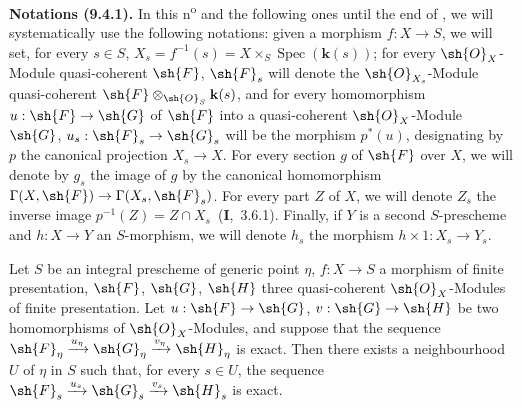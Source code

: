 \begin{env}[9.4.1]
\label{IV.9.4.1}
\textbf{Notations (9.4.1).}
In this n\textsuperscript{o} and the following ones until the end of , we will systematically use the following notations: given a morphism $f:X\to S$, we will set, for every $s\in S$, $X_s=f^{-1}(s)=X\times_S\operatorname{Spec}(\mathbf{k}(s))$; for every $\sh{O}_X$-Module quasi-coherent $\sh{F}$, $\sh{F}_s$ will denote the $\sh{O}_{X_s}$-Module quasi-coherent $\sh{F}\otimes_{\sh{O}_S}\mathbf{k}(s)$, and for every homomorphism $u:\sh{F}\to\sh{G}$ of $\sh{F}$ into a quasi-coherent $\sh{O}_X$-Module $\sh{G}$, $u_s:\sh{F}_s\to\sh{G}_s$ will be the morphism $p^*(u)$, designating by $p$ the canonical projection $X_s\to X$.
For every section $g$ of $\sh{F}$ over $X$, we will denote by $g_s$ the image of $g$ by the canonical homomorphism $\Gamma(X,\sh{F})\to\Gamma(X_s,\sh{F}_s)$.
For every part $Z$ of $X$, we will denote $Z_s$ the inverse image $p^{-1}(Z)=Z\cap X_s$~(\textbf{I},~3.6.1).
Finally, if $Y$ is a second $S$-prescheme and $h:X\to Y$ an $S$-morphism, we will denote $h_s$ the morphism $h\times 1:X_s\to Y_s$.
\end{env}

\begin{proposition}[9.4.2]
\label{IV.9.4.2}
Let $S$ be an integral prescheme of generic point $\eta$, $f:X\to S$ a morphism of finite presentation, $\sh{F}$, $\sh{G}$, $\sh{H}$ three quasi-coherent $\sh{O}_X$-Modules of finite presentation.
Let $u:\sh{F}\to\sh{G}$, $v:\sh{G}\to\sh{H}$ be two homomorphisms of $\sh{O}_X$-Modules, and suppose that the sequence $\sh{F}_\eta\xrightarrow{u_\eta}\sh{G}_\eta\xrightarrow{v_\eta}\sh{H}_\eta$ is exact.
Then there exists a neighbourhood $U$ of $\eta$ in $S$ such that, for every $s\in U$, the sequence $\sh{F}_s\xrightarrow{u_s}\sh{G}_s\xrightarrow{v_s}\sh{H}_s$ is exact.
\end{proposition}

